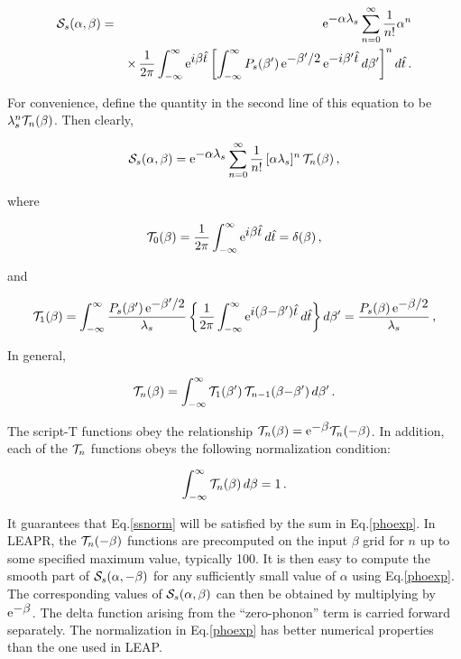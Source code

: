 \begin{eqnarray}
   {\cal S}_s(\alpha,\beta)&=&{\rm e}^{\textstyle -\alpha\lambda_s}\sum_{n=0}^{\infty}
      \frac{1}{n!}\alpha^n\nonumber\\
      & &\times\,\frac{1}{2\pi} \int_{-\infty}^\infty{\rm e}^{\textstyle i\beta\hat{t}}\left[
      \int_{-\infty}^\infty P_s(\beta')\,{\rm e}^{\textstyle -\beta'/2}\,{\rm e}^{\textstyle -i\beta'\hat{t}}
      \,d\beta'\right]^n d\hat{t}\,.
\end{eqnarray}

\noindent
For convenience, define the quantity in the second line of this equation
to be $\lambda_s^n {\cal T}_n(\beta)$.  Then clearly,

\begin{equation}
   {\cal S}_s(\alpha,\beta)={\rm e}^{\textstyle -\alpha\lambda_s}
    \sum_{n=0}^{\infty}\frac{1}{n!}\,[\alpha\lambda_s]^n\,{\cal T}_n(\beta)\,,
   \label{phoexp}
\end{equation}

\noindent
where

\begin{equation}
   {\cal T}_0(\beta)=\frac{1}{2\pi}
      \int_{-\infty}^\infty{\rm e}^{\textstyle i\beta\hat{t}}\,d\hat{t}=\delta(\beta)\,,
\end{equation}

\noindent
and

\begin{equation}
   {\cal T}_1(\beta)=\int_{-\infty}^\infty \frac{P_s(\beta')\,
      {\rm e}^{\textstyle -\beta'/2}}{\lambda_s}\left\{\frac{1}{2\pi}
      \int_{-\infty}^\infty{\rm e}^{\textstyle i(\beta{-}\beta')\hat{t}}\,d\hat{t}\right\}d\beta'
      =\frac{P_s(\beta)\,{\rm e}^{\textstyle -\beta/2}}{\lambda_s}\,,
\end{equation}

\noindent
In general,

\begin{equation}
   {\cal T}_n(\beta)=\int_{-\infty}^\infty {\cal T}_1(\beta')\,
      {\cal T}_{n-1}(\beta{-}\beta')\,d\beta'\,.
   \label{phoconv}
\end{equation}

\noindent
The script-T functions obey the relationship
${\cal T}_n(\beta)={\rm e}^{\textstyle -\beta}{\cal T}_n(-\beta)$.
In addition, each of the ${\cal T}_n$ functions
obeys the following normalization condition:

\begin{equation}
   \int_{-\infty}^\infty {\cal T}_n(\beta)\,d\beta = 1\,.
\end{equation}

\noindent
It guarantees that Eq.\ref{ssnorm} will be satisfied by the sum in
Eq.\ref{phoexp}.  In LEAPR, the ${\cal T}_n(-\beta)$ functions are
precomputed on the input $\beta$ grid for $n$ up to some specified
maximum value, typically 100.  It is then easy to compute the smooth
part of ${\cal S}_s(\alpha,-\beta)$ for any sufficiently small value of
$\alpha$ using Eq.\ref{phoexp}.  The corresponding values of
${\cal S}_s(\alpha,\beta)$ can then be obtained by multiplying by
${\rm e}^{\textstyle -\beta}$.  The delta function arising from the ``zero-phonon''
term is carried forward separately.  The normalization in
Eq.\ref{phoexp} has better numerical properties than the one used in
LEAP.

